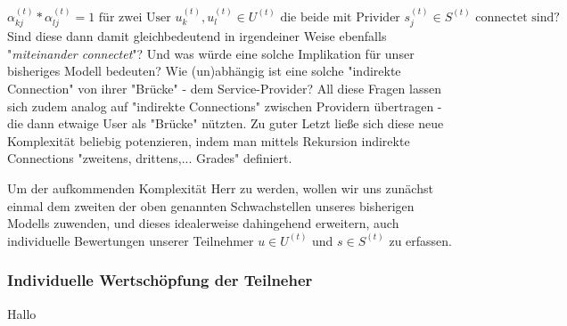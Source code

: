 \begin{equation*}
  \alpha^{(t)}_{kj} * \alpha^{(t)}_{lj} = 1 \textrm{ für zwei User } u^{(t)}_k, u^{(t)}_l \in U^{(t)} \textrm{ die beide mit Privider } s^{(t)}_j \in S^{(t)} \textrm{ connectet sind?}
\end{equation*}
Sind diese dann damit gleichbedeutend in irgendeiner Weise ebenfalls "\textit{miteinander connectet}"? Und was würde eine solche Implikation für unser bisheriges Modell bedeuten? Wie (un)abhängig ist eine solche "indirekte Connection" von ihrer "Brücke" - dem Service-Provider? All diese Fragen lassen sich zudem analog auf "indirekte Connections" zwischen Providern übertragen - die dann etwaige User als "Brücke" nützten. Zu guter Letzt ließe sich diese neue Komplexität beliebig potenzieren, indem man mittels Rekursion indirekte Connections "zweitens, drittens,... Grades" definiert.

Um der aufkommenden Komplexität Herr zu werden, wollen wir uns zunächst einmal dem zweiten der oben genannten Schwachstellen unseres bisherigen Modells zuwenden, und dieses idealerweise dahingehend erweitern, auch individuelle Bewertungen unserer Teilnehmer $u \in U^{(t)}$ und $s \in S^{(t)}$ zu erfassen.


\subsubsection{Individuelle Wertschöpfung der Teilneher}
\label{sec:eco_zahlen_teilnehmer}

Hallo